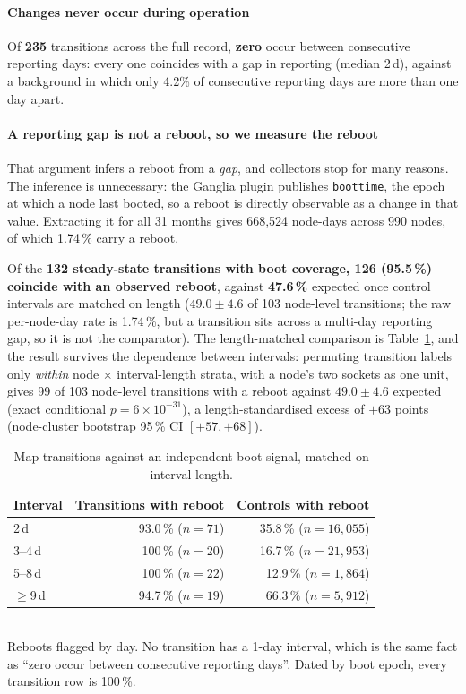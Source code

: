\documentclass[10pt,conference]{IEEEtran}
\begin{document}
\paragraph*{Changes never occur during operation} Of \textbf{235} transitions across the full
record, \textbf{zero} occur between consecutive reporting days: every one coincides with a gap in
reporting (median 2\,d), against a background in which only 4.2\% of consecutive reporting days
are more than one day apart.

\paragraph*{A reporting gap is not a reboot, so we measure the reboot}
\label{par:reboot}
That argument infers a reboot from a \emph{gap}, and collectors stop for many reasons. The
inference is unnecessary: the Ganglia plugin publishes \texttt{boottime}, the epoch at which a
node last booted, so a reboot is directly observable as a change in that value. Extracting it for
all 31 months gives 668{,}524 node-days across 990 nodes, of which 1.74\,\% carry a reboot.

Of the \textbf{132 steady-state transitions with boot coverage, 126 (95.5\,\%) coincide with an
observed reboot}, against \textbf{47.6\,\%} expected once control intervals are matched on
length ($49.0\pm4.6$ of 103 node-level transitions; the raw per-node-day rate is 1.74\,\%, but a
transition sits across a multi-day reporting gap, so it is not the comparator). The length-matched
comparison is Table~\ref{tab:reboot}, and the result survives the dependence between intervals:
permuting transition labels only \emph{within} node $\times$ interval-length strata, with a node's
two sockets as one unit, gives 99 of 103 node-level transitions with a reboot against $49.0\pm4.6$
expected (exact conditional $p=6\times10^{-31}$), a length-standardised excess of $+63$ points
(node-cluster bootstrap 95\,\% CI $[+57,+68]$).

\begin{table}[h]\centering\caption{Map transitions against an independent boot signal, matched on
interval length.}\label{tab:reboot}\footnotesize
\begin{tabular}{lrr}\toprule
Interval & Transitions with reboot & Controls with reboot\\\midrule
2\,d      & 93.0\,\% ($n=71$)   & 35.8\,\% ($n=16{,}055$)\\
3--4\,d   & 100\,\% ($n=20$)    & 16.7\,\% ($n=21{,}953$)\\
5--8\,d   & 100\,\% ($n=22$)    & 12.9\,\% ($n=1{,}864$)\\
$\ge$9\,d & 94.7\,\% ($n=19$)   & 66.3\,\% ($n=5{,}912$)\\
\bottomrule\end{tabular}
\\[2pt]\footnotesize Reboots flagged by day. No transition has a 1-day interval, which is the same
fact as ``zero occur between consecutive reporting days''. Dated by boot epoch, every transition
row is 100\,\%.
\end{table}
\end{document}
